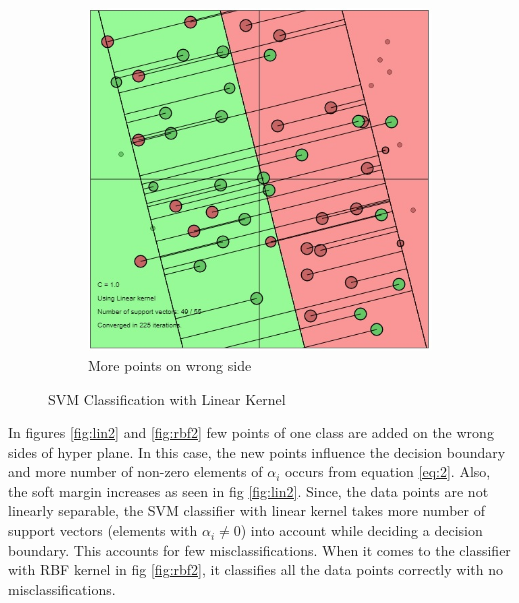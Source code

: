 \documentclass[12pt]{report}
\begin{document}
{\begin{figure}[ht]
\begin{subfigure}{.3\textwidth}
  			\includegraphics[width=.7\linewidth]{linear_kernel_3.jpg}
  			\caption{More points on wrong side}
  			\label{fig:lin3}
  		\end{subfigure}%
  		\caption{SVM Classification with Linear Kernel}
  		\label{fig:lin_rbf1}
  	  \end{figure}
    
	   In figures \ref{fig:lin2} and \ref{fig:rbf2} few points of one class are added on the wrong sides of hyper plane. In this case, the new points influence the decision boundary and more number of non-zero elements of $\alpha_i$ occurs from equation \ref{eq:2}. Also, the soft margin increases as seen in fig \ref{fig:lin2}. Since, the data points are not linearly separable, the SVM classifier with linear kernel takes more number of support vectors (elements with $\alpha_i \neq 0$) into account while deciding a decision boundary.  This accounts for few misclassifications. When it comes to the classifier with RBF kernel in fig \ref{fig:rbf2}, it classifies all the data points correctly with no misclassifications. 

}
\end{document}
